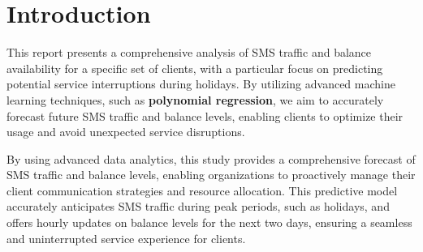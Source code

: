 \documentclass[12pt]{book} %
\begin{document}







{}






\thispagestyle{empty}
\tableofcontents
\thispagestyle{empty}
\clearpage






\setcounter{page}{1}




\chapter{Introduction}
This report presents a comprehensive analysis of SMS traffic and balance availability for a specific set of clients, with a particular focus on predicting potential service interruptions during holidays. By utilizing advanced machine learning techniques, such as \textbf{polynomial regression}, we aim to accurately forecast future SMS traffic and balance levels, enabling clients to optimize their usage and avoid unexpected service disruptions. 

By using advanced data analytics, this study provides a comprehensive forecast of SMS traffic and balance levels, enabling organizations to proactively manage their client communication strategies and resource allocation. This predictive model accurately anticipates SMS traffic during peak periods, such as holidays, and offers hourly updates on balance levels for the next two days, ensuring a seamless and uninterrupted service experience for clients.
\end{document}
